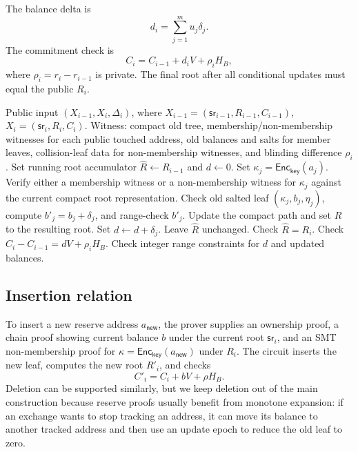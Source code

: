 \documentclass[runningheads]{llncs}
\newcommand{\Enc}{\mathsf{Enc}}
\newcommand{\sr}{\mathsf{sr}}
\newcommand{\Rel}{\mathcal{R}}
\newcommand{\dlist}{\Delta}
\begin{document}
The balance delta is
\[
        d_i=\sum_{j=1}^m u_j\delta_j.
\]
The commitment check is
\[
        C_i=C_{i-1}+d_iV+\rho_iH_B,
\]
where \(\rho_i=r_i-r_{i-1}\) is private.  The final root after all conditional updates must equal the public \(R_i\).

\begin{algorithm}[t]
\caption{SMT update relation \(\Rel_{\mathsf{upd}}^{\mathsf{smt}}\)}
\begin{algorithmic}[1]
\Require Public input \((X_{i-1},X_i,\dlist_i)\), where \(X_{i-1}=(\sr_{i-1},R_{i-1},C_{i-1})\), \(X_i=(\sr_i,R_i,C_i)\).
\Require Witness: compact old tree, membership/non-membership witnesses for each public touched address, old balances and salts for member leaves, collision-leaf data for non-membership witnesses, and blinding difference \(\rho_i\).
\State Set running root accumulator \(\widehat R\leftarrow R_{i-1}\) and \(d\leftarrow 0\).
    \State Set \(\kappa_j=\Enc_{\mathsf{key}}(a_j)\).
    \State Verify either a membership witness or a non-membership witness for \(\kappa_j\) against the current compact root representation.
        \State Check old salted leaf \((\kappa_j,b_j,\eta_j)\), compute \(b'_j=b_j+\delta_j\), and range-check \(b'_j\).
        \State Update the compact path and set \(\widehat R\) to the resulting root.
        \State Set \(d\leftarrow d+\delta_j\).
    \Else
        \State Leave \(\widehat R\) unchanged.
    \EndIf
\EndFor
\State Check \(\widehat R=R_i\).
\State Check \(C_i-C_{i-1}=dV+\rho_iH_B\).
\State Check integer range constraints for \(d\) and updated balances.
\end{algorithmic}
\end{algorithm}

\subsection{Insertion relation}

To insert a new reserve address \(a_{\mathsf{new}}\), the prover supplies an ownership proof, a chain proof showing current balance \(b\) under the current root \(\sr_i\), and an SMT non-membership proof for \(\kappa=\Enc_{\mathsf{key}}(a_{\mathsf{new}})\) under \(R_i\).  The circuit inserts the new leaf, computes the new root \(R'_i\), and checks
\[
        C'_i=C_i+bV+\rho H_B.
\]
Deletion can be supported similarly, but we keep deletion out of the main construction because reserve proofs usually benefit from monotone expansion: if an exchange wants to stop tracking an address, it can move its balance to another tracked address and then use an update epoch to reduce the old leaf to zero.
\end{document}
